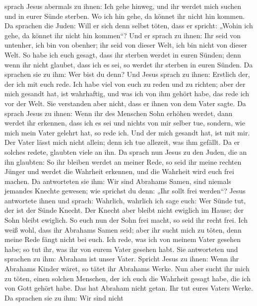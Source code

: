 sprach Jesus abermals zu ihnen: Ich gehe hinweg, und ihr werdet mich
suchen und in eurer Sünde sterben. Wo ich hin gehe, da könnet ihr nicht
hin kommen.  Da sprachen die Juden: Will er sich denn
selbst töten, dass er spricht: „Wohin ich gehe, da könnet ihr nicht hin
kommen``?  Und er sprach zu ihnen: Ihr seid von untenher,
ich bin von obenher; ihr seid von dieser Welt, ich bin nicht von dieser
Welt.  So habe ich euch gesagt, dass ihr sterben werdet in
euren Sünden; denn wenn ihr nicht glaubet, dass ich es sei, so werdet
ihr sterben in euren Sünden.  Da sprachen sie zu ihm: Wer
bist du denn? Und Jesus sprach zu ihnen: Erstlich der, der ich mit euch
rede.  Ich habe viel von euch zu reden und zu richten; aber
der mich gesandt hat, ist wahrhaftig, und was ich von ihm gehört habe,
das rede ich vor der Welt.  Sie verstanden aber nicht, dass
er ihnen von dem Vater sagte.  Da sprach Jesus zu ihnen:
Wenn ihr des Menschen Sohn erhöhen werdet, dann werdet ihr erkennen,
dass ich es sei und nichts von mir selber tue, sondern, wie mich mein
Vater gelehrt hat, so rede ich.  Und der mich gesandt hat,
ist mit mir. Der Vater lässt mich nicht allein; denn ich tue allezeit,
was ihm gefällt.  Da er solches redete, glaubten viele an
ihn.  Da sprach nun Jesus zu den Juden, die an ihn
glaubten: So ihr bleiben werdet an meiner Rede, so seid ihr meine
rechten Jünger  und werdet die Wahrheit erkennen, und die
Wahrheit wird euch frei machen.  Da antworteten sie ihm:
Wir sind Abrahams Samen, sind niemals jemandes Knechte gewesen; wie
sprichst du denn: „Ihr sollt frei werden``?  Jesus
antwortete ihnen und sprach: Wahrlich, wahrlich ich sage euch: Wer Sünde
tut, der ist der Sünde Knecht.  Der Knecht aber bleibt
nicht ewiglich im Hause; der Sohn bleibt ewiglich.  So euch
nun der Sohn frei macht, so seid ihr recht frei.  Ich weiß
wohl, dass ihr Abrahams Samen seid; aber ihr sucht mich zu töten, denn
meine Rede fängt nicht bei euch.  Ich rede, was ich von
meinem Vater gesehen habe; so tut ihr, was ihr von eurem Vater gesehen
habt.  Sie antworteten und sprachen zu ihm: Abraham ist
unser Vater. Spricht Jesus zu ihnen: Wenn ihr Abrahams Kinder wäret, so
tätet ihr Abrahams Werke.  Nun aber sucht ihr mich zu
töten, einen solchen Menschen, der ich euch die Wahrheit gesagt habe,
die ich von Gott gehört habe. Das hat Abraham nicht getan. 
Ihr tut eures Vaters Werke. Da sprachen sie zu ihm: Wir sind nicht
